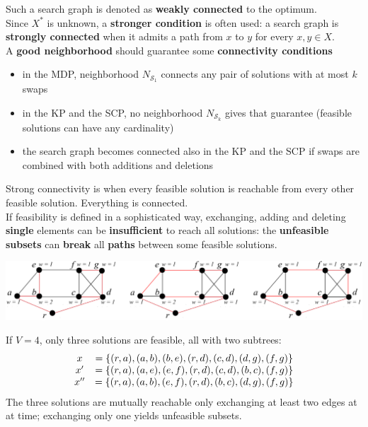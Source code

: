 Such a search graph is denoted as \textbf{weakly connected} to the optimum.\\

Since $X^\ast$ is unknown, a \textbf{stronger condition} is often used: a search graph is \textbf{strongly connected} when it admits a path from $x$ to $y$ for every $x, y \in X$.\\

A \textbf{good neighborhood} should guarantee some \textbf{connectivity conditions}
\begin{itemize}
	\item in the MDP, neighborhood $N_{\mathcal{S}_1}$ connects any pair of solutions with at most $k$ swaps
	
	\item in the KP and the SCP, no neighborhood $N_{\mathcal{S}_k}$ gives that guarantee (feasible solutions can have any cardinality)
	
	\item the search graph becomes connected also in the KP and the SCP if swaps are combined with both additions and deletions
\end{itemize}

Strong connectivity is when every feasible solution is reachable from every other feasible solution. Everything is connected.\\

If feasibility is defined in a sophisticated way, exchanging, adding and deleting \textbf{single} elements can be \textbf{insufficient} to reach all solutions: the \textbf{unfeasible subsets} can \textbf{break} all \textbf{paths} between some feasible solutions.

\begin{center}
	\includegraphics[width=\columnwidth]{img/connectivity}
\end{center}

If $V = 4$, only three solutions are feasible, all with two subtrees:
$$
\begin{array}{c c}
	x & = \{(r , a) , (a, b) , (b, e) , (r , d) , (c, d) , (d, g ) , (f , g )\} \\
	x' & = \{(r , a) , (a, e) , (e, f ) , (r , d) , (c, d) , (b, c) , (f , g )\} \\
	x'' & = \{(r , a) , (a, b) , (e, f ) , (r , d) , (b, c) , (d, g ) , (f , g )\}
\end{array}
$$
The three solutions are mutually reachable only exchanging at least two edges at at time; exchanging only one yields unfeasible subsets.

